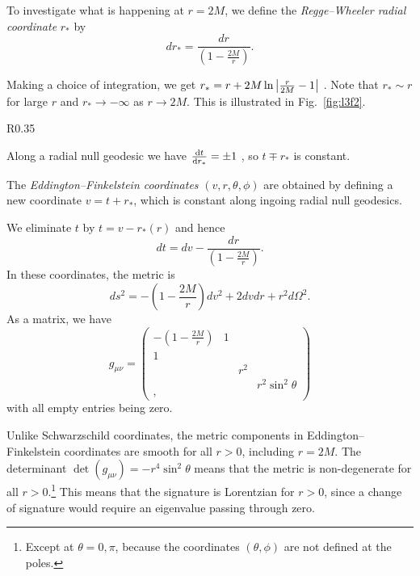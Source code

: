  \begin{definition}
  To investigate what is happening at $r = 2M$, we define the  \emph{Regge--Wheeler radial coordinate} $r_*$ by
   \begin{equation}
     dr_* = \frac{dr}{\left( 1 - \frac{2M}{r} \right)}.
  \end{equation}
\end{definition}
Making a choice of integration, we get $r_* = r + 2M \ln \abs{\frac{r}{2M} - 1}$ .
Note that $r_* \sim r$  for large $r$ and  $r_* \to - \infty$  as $r \to 2M$. This is illustrated in Fig.~\ref{fig:l3f2}.
\begin{wrapfigure}{R}{0.35\columnwidth}
  \centering
  \def\svgwidth{0.3\columnwidth}
  
  \caption{Regge--Wheeler radial coordinates.}
  \label{fig:l3f2}
\end{wrapfigure}
Along a radial null geodesic we have  $\dv{t}{r_*} = \pm 1$ , so $t \mp r_*$ is constant.
\begin{definition}
  The \emph{Eddington--Finkelstein coordinates} $(v, r, \theta, \phi)$ are obtained by defining a new coordinate $v = t + r_*$, which is constant along ingoing radial null geodesics. 
\end{definition}
We eliminate $t$ by $t = v - r_*(r)$ and hence
\begin{equation}
  dt = dv - \frac{dr}{\left( 1 - \frac{2M}{r} \right)}.
\end{equation}
In these coordinates, the metric is
\begin{equation}
  \label{eq:3-2}
  ds^2 = - \left( 1 - \frac{2M}{r} \right) dv^2 + 2 dv dr + r^2 d\Omega^2.
\end{equation}
As a matrix, we have
\begin{equation}
  g_{\mu\nu} = 
  \begin{pmatrix}
    - \left( 1 - \frac{2M}{r} \right) & 1 &  &  \\
   1 &  &  &  \\
    &  & r^2 &  \\
    &  &  & r^2 \sin^2 \theta \\,
  \end{pmatrix}
\end{equation}
with all empty entries being zero.

Unlike Schwarzschild coordinates, the metric components in Eddington--Finkelstein coordinates are smooth for all  $r > 0$, including  $r = 2M$.
The determinant  $\det (g_{\mu\nu}) = -r^4 \sin^2 \theta$  means that the metric is non-degenerate for all $r > 0$.\footnote{Except at $\theta = 0, \pi$, because the coordinates $(\theta, \phi)$ are not defined at the poles.}
This means that the signature is Lorentzian for  $r > 0$, since a change of signature would require an eigenvalue passing through zero.

